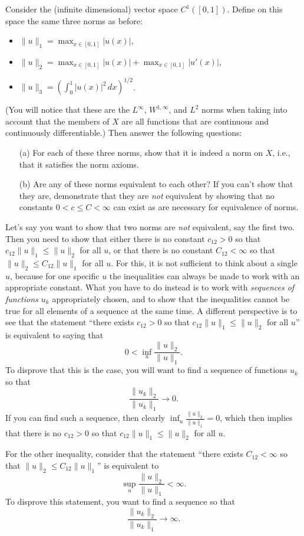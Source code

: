 \documentclass[12pt]{memoir}
\begin{document}
\begin{Ej}
    Consider the (infinite dimensional) vector space $C^1([0,1])$.
Define on this space the same three norms as before:
\begin{itemize}
\item $\|u\|_1 = \max_{x \in [0,1]} |u(x)|$,
\item $\|u\|_2 = \max_{x \in [0,1]} |u(x)| + \max_{x \in [0,1]}
  |u'(x)|$,
\item $\|u\|_3 = \left(\int_0^1 |u(x)|^2 \, dx\right)^{1/2}$.
\end{itemize}
(You will notice that these are the $L^\infty$, $W^{1,\infty}$, and
$L^2$ norms when taking into account that the members of $X$ are all
functions that are continuous and continuously differentiable.) 
Then answer the following questions:
\begin{itemize}
\item[(a)] For each of these three norms, show that it is indeed a
  norm on $X$, i.e., that it satisfies the norm axioms.
\item[(b)] Are any of these norms equivalent to each other? If you
  can't show that they are, demonstrate that they are \textit{not}
  equivalent by showing that no constants $0<c\le C<\infty$ can exist as are
  necessary for equivalence of norms.
\end{itemize}
\end{Ej}
\begin{nonum-Rmk}
    Let's say you want to show that two norms are
    \textit{not} equivalent, say the first two. Then you need to show that either
    there is no constant $c_{12}>0$ so that $c_{12} \| u \|_{1} \le \| u
    \|_{2}$ for all $u$, or that there is no constant $C_{12}<\infty$ so
    that $\|u\|_2 \le C_{12} \| u \|_{1}$ for all $u$. For this, it is
    not sufficient to think about a single $u$, because for one specific
    $u$ the inequalities can always be made to work with an appropriate
    constant. What you have to do instead is to work with
    \textit{sequences of functions $u_k$} appropriately chosen, and to
    show that the inequalities cannot be true for all elements of a
    sequence at the same time. A different perspective is to see that
    the statement ``there exists $c_{12}>0$ so that $c_{12} \| u \|_{1} \le \| u
    \|_{2}$ for all $u$'' is equivalent to saying that
    $$
      0 < \inf_{u} \frac{\| u \|_{2}}{\| u \|_{1}}.
    $$
    To disprove that this is the case, you will want to find a sequence
    of functions $u_k$ so that
    $$
      \frac{\| u_k \|_{2}}{\| u_k \|_{1}} \rightarrow 0.
    $$
    If you can find such a sequence, then clearly $\inf_{u} \frac{\| u
      \|_{2}}{\| u \|_{1}}=0$, which then implies that there is no
    $c_{12}>0$ so that $c_{12} \| u \|_{1} \le \| u
    \|_{2}$ for all $u$.
  
    For the other inequality, consider that the statement ``there exists
    $C_{12}<\infty$ so that $\|u\|_2 \le C_{12} \| u \|_{1}$'' is
    equivalent to
    $$
      \sup_{u} \frac{\| u \|_{2}}{\| u \|_{1}} < \infty.
    $$
    To disprove this statement, you want to find a sequence so that
    $$
      \frac{\| u_k \|_{2}}{\| u_k \|_{1}} \rightarrow \infty.
    $$
\end{nonum-Rmk}
\end{document}
